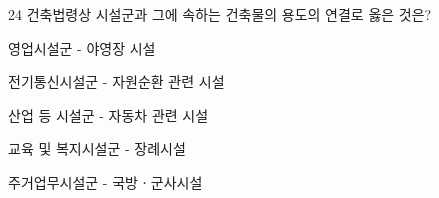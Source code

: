 \begin{question}{24}
건축법령상 시설군과 그에 속하는 건축물의 용도의 연결로 옳은 것은?
\begin{choices}
  \item 영업시설군 - 야영장 시설
  \item 전기통신시설군 - 자원순환 관련 시설
  \item 산업 등 시설군 - 자동차 관련 시설
  \item 교육 및 복지시설군 - 장례시설
  \item 주거업무시설군 - 국방ㆍ군사시설
\end{choices}
\end{question}
